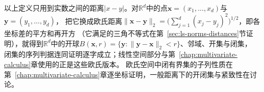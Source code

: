 以上定义只用到实数之间的距离$|x-y|$。对$\mathbb R^d$中的点$\bm x=(x_1,\ldots,x_d)$与$\bm y=(y_1,\ldots,y_d)$，
把它换成欧氏距离$\lVert\bm x-\bm y\rVert_2=\bigl(\sum_{j=1}^d(x_j-y_j)^2\bigr)^{1/2}$，即各坐标差的平方和再开方
（它满足的三角不等式在第~\ref{sec:ls-norms-distances}节证明），就得到$\mathbb R^d$中的开球$B(\bm x,r)=\{\bm y:\lVert\bm y-\bm x\rVert_2<r\}$、邻域、开集与闭集，
闭集的序列判据连同证明逐字成立；线性空间部分与第~\ref{chap:multivariate-calculus}章使用的正是这些欧氏版本。
欧氏空间中闭有界集的子列性质在第~\ref{chap:multivariate-calculus}章逐坐标证明，一般距离下的开闭集与紧致性在讨论。

\FloatBarrier
